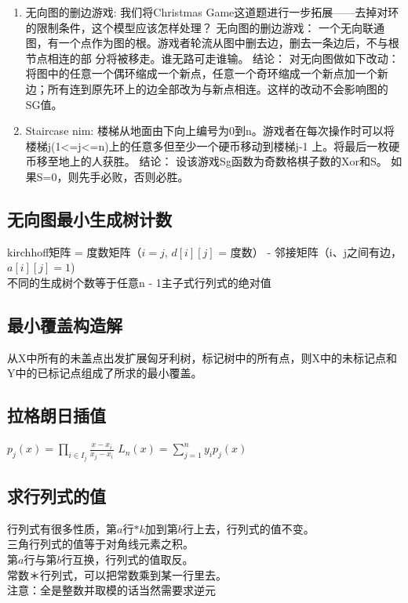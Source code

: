 \documentclass[landscape,a4paper]{article}
\begin{document}
\begin{spacing}{0.3}
\begin{multicols}{2}
\begin{enumerate}
		（2）对于长度为偶数的环，去掉其中任意一个边之后，剩下的两个链长度异奇偶，抑或之后的SG值不可能为0，所以它的SG值为0；所以我们可以去掉所有的偶环，将所有的奇环变为长短为1 的链。
		这样的话，我们已经将这道题改造成了上一节的模型。
	\item 无向图的删边游戏:
		我们将Christmas Game这道题进行一步拓展——去掉对环的限制条件，这个模型应该怎样处理？
		无向图的删边游戏：
		一个无向联通图，有一个点作为图的根。游戏者轮流从图中删去边，删去一条边后，不与根节点相连的部 分将被移走。谁无路可走谁输。
		结论：
		对无向图做如下改动：将图中的任意一个偶环缩成一个新点，任意一个奇环缩成一个新点加一个新边；所有连到原先环上的边全部改为与新点相连。这样的改动不会影响图的SG值。
	\item Staircase nim:
		楼梯从地面由下向上编号为0到n。游戏者在每次操作时可以将楼梯j(1<=j<=n)上的任意多但至少一个硬币移动到楼梯j-1 上。将最后一枚硬币移至地上的人获胜。
		结论：
		设该游戏Sg函数为奇数格棋子数的Xor和S。
		如果S=0，则先手必败，否则必胜。
\end{enumerate}




\subsection{无向图最小生成树计数}
kirchhoff矩阵 = 度数矩阵（$i = j$, $d[i][j]$ = 度数） - 邻接矩阵（i、j之间有边， $a[i][j] = 1$)\\
不同的生成树个数等于任意n - 1主子式行列式的绝对值

\subsection{最小覆盖构造解}
从X中所有的未盖点出发扩展匈牙利树，标记树中的所有点，则X中的未标记点和Y中的已标记点组成了所求的最小覆盖。

\subsection{拉格朗日插值}
		$p_j(x) = \prod_{i\in{I_j}}\frac{x-x_i}{x_j-x_i}$
		$L_n(x) = \sum_{j=1}^{n}y_ip_j(x)$
		\subsection{求行列式的值}
			行列式有很多性质，第$a$行$*k$加到第$b$行上去，行列式的值不变。\\
			三角行列式的值等于对角线元素之积。\\
			第$a$行与第$b$行互换，行列式的值取反。\\
			常数＊行列式，可以把常数乘到某一行里去。\\
			注意：全是整数并取模的话当然需要求逆元

\end{multicols}
\end{spacing}
\end{document}
